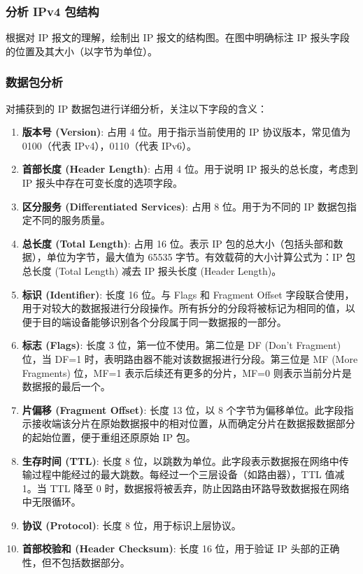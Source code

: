 \documentclass{article}
\begin{document}
	\subsubsection{分析 IPv4 包结构}
	根据对 IP 报文的理解，绘制出 IP 报文的结构图。在图中明确标注 IP 报头字段的位置及其大小（以字节为单位）。
	
	\subsubsection{数据包分析}
	对捕获到的 IP 数据包进行详细分析，关注以下字段的含义：
	\begin{enumerate}
		\item \textbf{版本号 (Version)}: 占用 4 位。用于指示当前使用的 IP 协议版本，常见值为 0100（代表 IPv4），0110（代表 IPv6）。
		\item \textbf{首部长度 (Header Length)}: 占用 4 位。用于说明 IP 报头的总长度，考虑到 IP 报头中存在可变长度的选项字段。
		\item \textbf{区分服务 (Differentiated Services)}: 占用 8 位。用于为不同的 IP 数据包指定不同的服务质量。
		\item \textbf{总长度 (Total Length)}: 占用 16 位。表示 IP 包的总大小（包括头部和数据），单位为字节，最大值为 65535 字节。有效载荷的大小计算公式为：IP 包总长度 (Total Length) 减去 IP 报头长度 (Header Length)。
		\item \textbf{标识 (Identifier)}: 长度 16 位。与 Flags 和 Fragment Offset 字段联合使用，用于对较大的数据报进行分段操作。所有拆分的分段将被标记为相同的值，以便于目的端设备能够识别各个分段属于同一数据报的一部分。
		\item \textbf{标志 (Flags)}: 长度 3 位，第一位不使用。第二位是 DF (Don't Fragment) 位，当 DF=1 时，表明路由器不能对该数据报进行分段。第三位是 MF (More Fragments) 位，MF=1 表示后续还有更多的分片，MF=0 则表示当前分片是数据报的最后一个。
		\item \textbf{片偏移 (Fragment Offset)}: 长度 13 位，以 8 个字节为偏移单位。此字段指示接收端该分片在原始数据报中的相对位置，从而确定分片在数据报数据部分的起始位置，便于重组还原原始 IP 包。
		\item \textbf{生存时间 (TTL)}: 长度 8 位，以跳数为单位。此字段表示数据报在网络中传输过程中能经过的最大跳数。每经过一个三层设备（如路由器），TTL 值减 1。当 TTL 降至 0 时，数据报将被丢弃，防止因路由环路导致数据报在网络中无限循环。
		\item \textbf{协议 (Protocol)}: 长度 8 位，用于标识上层协议。
		\item \textbf{首部校验和 (Header Checksum)}: 长度 16 位，用于验证 IP 头部的正确性，但不包括数据部分。
	\end{enumerate}
	
\end{document}
